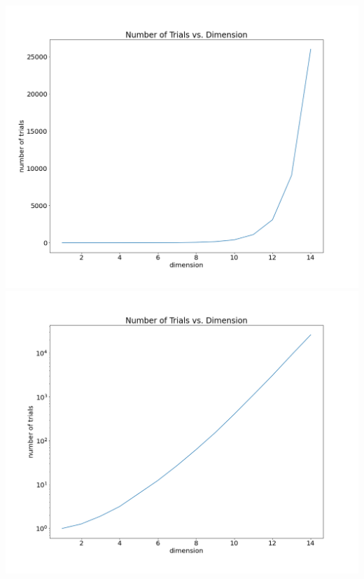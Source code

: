 \documentclass{article}
\begin{document}

\begin{center}
  \includegraphics[scale=0.3]{manim/project/images/Trials vs. Dimension Linear.png}
  \includegraphics[scale=0.3]{manim/project/images/Trials vs. Dimension Log.png}
\end{center}
\end{document}
